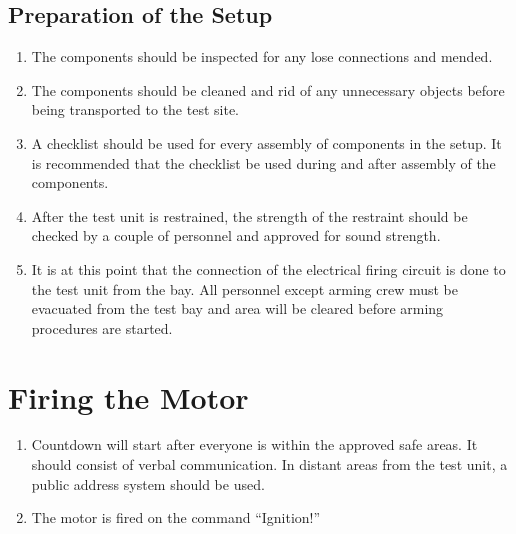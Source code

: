 \documentclass[12pt,letterpaper]{article}
\begin{document}
        \subsection{Preparation of the Setup}
            \begin{enumerate}
                 \begin{enumerate}
                     \item The components should be inspected for any lose
                     connections and mended. 
                     \item The components should be cleaned and rid of any
                     unnecessary objects before being transported to the test
                     site. 
                     \item A checklist should be used for every assembly of
                     components in the setup. It is recommended that the
                     checklist be used during and after assembly of the
                     components. 
                     \item After the test unit is restrained, the strength
                     of the restraint should be checked by a couple of
                     personnel and approved for sound strength. 
                     \item It is at this point that the connection of the
                     electrical firing circuit is done to the test unit
                     from the bay. All personnel except arming crew must be
                     evacuated from the test bay and area will be cleared
                     before arming procedures are started.
                 \end{enumerate}
            \end{enumerate}
    \section{Firing the Motor}
        \begin{enumerate}
            \begin{enumerate}
                \item Countdown will start after everyone is within the
                approved safe areas. It should consist of verbal communication.
                In distant areas from the test unit, a public address system
                should be used. 
                \item The motor is fired on the command “Ignition!”
            \end{enumerate}
        \end{enumerate}
\end{document}
